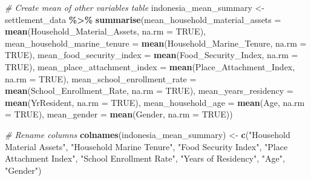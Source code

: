 \documentclass[
]{article}
\newenvironment{Shaded}{\begin{snugshade}}{\end{snugshade}}
\newcommand{\AttributeTok}[1]{\textcolor[rgb]{0.13,0.29,0.53}{#1}}
\newcommand{\CommentTok}[1]{\textcolor[rgb]{0.56,0.35,0.01}{\textit{#1}}}
\newcommand{\ConstantTok}[1]{\textcolor[rgb]{0.56,0.35,0.01}{#1}}
\newcommand{\FunctionTok}[1]{\textcolor[rgb]{0.13,0.29,0.53}{\textbf{#1}}}
\newcommand{\NormalTok}[1]{#1}
\newcommand{\OtherTok}[1]{\textcolor[rgb]{0.56,0.35,0.01}{#1}}
\newcommand{\SpecialCharTok}[1]{\textcolor[rgb]{0.81,0.36,0.00}{\textbf{#1}}}
\newcommand{\StringTok}[1]{\textcolor[rgb]{0.31,0.60,0.02}{#1}}
\begin{document}
\begin{Shaded}
\begin{Highlighting}[]
\CommentTok{\# Create mean of other variables table}
\NormalTok{indonesia\_mean\_summary }\OtherTok{\textless{}{-}}\NormalTok{ settlement\_data }\SpecialCharTok{\%\textgreater{}\%} 
  \FunctionTok{summarise}\NormalTok{(}\AttributeTok{mean\_household\_material\_assets =} \FunctionTok{mean}\NormalTok{(Household\_Material\_Assets,}
                                                  \AttributeTok{na.rm =} \ConstantTok{TRUE}\NormalTok{),}
            \AttributeTok{mean\_household\_marine\_tenure =} \FunctionTok{mean}\NormalTok{(Household\_Marine\_Tenure,}
                                                \AttributeTok{na.rm =} \ConstantTok{TRUE}\NormalTok{),}
            \AttributeTok{mean\_food\_security\_index =} \FunctionTok{mean}\NormalTok{(Food\_Security\_Index,}
                                            \AttributeTok{na.rm =} \ConstantTok{TRUE}\NormalTok{),}
            \AttributeTok{mean\_place\_attachment\_index =} \FunctionTok{mean}\NormalTok{(Place\_Attachment\_Index,}
                                               \AttributeTok{na.rm =} \ConstantTok{TRUE}\NormalTok{),}
            \AttributeTok{mean\_school\_enrollment\_rate =} \FunctionTok{mean}\NormalTok{(School\_Enrollment\_Rate,}
                                               \AttributeTok{na.rm =} \ConstantTok{TRUE}\NormalTok{),}
            \AttributeTok{mean\_years\_residency =} \FunctionTok{mean}\NormalTok{(YrResident, }\AttributeTok{na.rm =} \ConstantTok{TRUE}\NormalTok{),}
            \AttributeTok{mean\_household\_age =} \FunctionTok{mean}\NormalTok{(Age, }\AttributeTok{na.rm =} \ConstantTok{TRUE}\NormalTok{),}
            \AttributeTok{mean\_gender =} \FunctionTok{mean}\NormalTok{(Gender, }\AttributeTok{na.rm =} \ConstantTok{TRUE}\NormalTok{))}

\CommentTok{\# Rename columns}
\FunctionTok{colnames}\NormalTok{(indonesia\_mean\_summary) }\OtherTok{\textless{}{-}} \FunctionTok{c}\NormalTok{(}\StringTok{"Household Material Assets"}\NormalTok{,}
                                      \StringTok{"Household Marine Tenure"}\NormalTok{,}
                                      \StringTok{"Food Security Index"}\NormalTok{,}
                                      \StringTok{"Place Attachment Index"}\NormalTok{,}
                                      \StringTok{"School Enrollment Rate"}\NormalTok{,}
                                      \StringTok{"Years of Residency"}\NormalTok{,}
                                      \StringTok{"Age"}\NormalTok{,}
                                      \StringTok{"Gender"}\NormalTok{)}


\end{Highlighting}
\end{Shaded}
\end{document}
